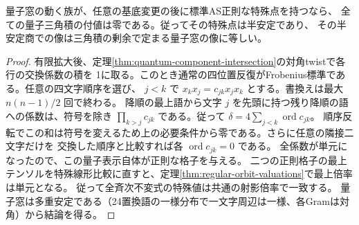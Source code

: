 \begin{corollary}\label{cor:quantum-no-polar-limits}
量子窓の動く族が、任意の基底変更の後に標準AS正則な特殊点を持つなら、
全ての量子三角積の付値は零である。従ってその特殊点は半安定であり、
その半安定商での像は三角積の剰余で定まる量子窓の像に等しい。
\end{corollary}
\begin{proof}
有限拡大後、定理\ref{thm:quantum-component-intersection}の対角twistで各行の交換係数の積を
1に取る。このとき通常の四位置反復がFrobenius標準である。任意の四文字順序を選び、
$j<k$ で $x_kx_j=c_{jk}x_jx_k$ とする。書換えは最大 $n(n-1)/2$ 回で終わる。
降順の最上語から文字 $j$ を先頭に持つ残り降順の語への係数は、符号を除き
$\prod_{k>j}c_{jk}$ である。従って $\delta=4\sum_{j<k}\operatorname{ord}c_{jk}$。
順序反転でこの和は符号を変えるため上の必要条件から零である。さらに任意の隣接二文字だけを
交換した順序と比較すれば各 $\operatorname{ord}c_{jk}=0$ である。
全係数が単元になったので、この量子表示自体が正則な格子を与える。
二つの正則格子の最上テンソルを特殊線形比較に直すと、定理\ref{thm:regular-orbit-valuations}で最上倍率は単元となる。
従って全斉次不変式の特殊値は共通の射影倍率で一致する。
量子窓は多重安定である（24置換語の一様分布で一文字周辺は一様、各Gramは対角）から結論を得る。
\end{proof}

